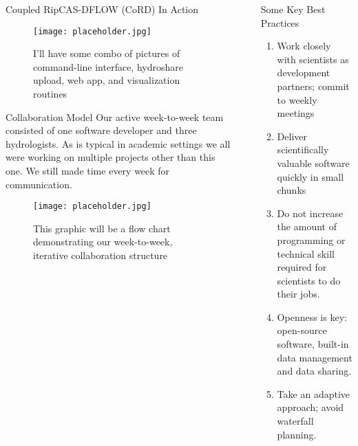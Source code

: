 \documentclass[final]{beamer}
\newlength{\sepwid}
\newlength{\onecolwid}
\newlength{\twocolwid}
\begin{document}
\begin{frame}[t]
\begin{columns}[t]
\begin{column}{\twocolwid}
\begin{alertblock}{Coupled RipCAS-DFLOW (CoRD) In Action}
        \begin{figure}
            \texttt{[image: placeholder.jpg]}
            \caption{I'll have some combo of pictures of command-line interface, hydroshare upload, web app, and visualization routines}
        \end{figure}
    \end{alertblock}

    \vspace{1in}

    \begin{alertblock}{Collaboration Model}
        Our active week-to-week team consisted of one software developer and three hydrologists.
        As is typical in academic settings we all were working on multiple projects other than this one. We
        still made time every week for communication.

        \begin{figure}
            \texttt{[image: placeholder.jpg]}
            \caption{This graphic will be a flow chart demonstrating our week-to-week,
                     iterative collaboration structure}
        \end{figure}
    \end{alertblock}

\end{column} %

\begin{column}{\sepwid}\end{column} %

\begin{column}{\onecolwid} %


\begin{block}{Some Key Best Practices}
    \begin{enumerate}
        \item{Work closely with scientists as development partners; commit to weekly meetings}
        \item{Deliver scientifically valuable software quickly in small chunks}
        \item{Do not increase the amount of programming or technical skill required for scientists to do their jobs.}
        \item{Openness is key: open-source software, built-in data management and data sharing.}
        \item{Take an adaptive approach; avoid waterfall planning.}
    \end{enumerate}
\end{block}


\end{column}
\end{columns}
\end{frame}
\end{document}
